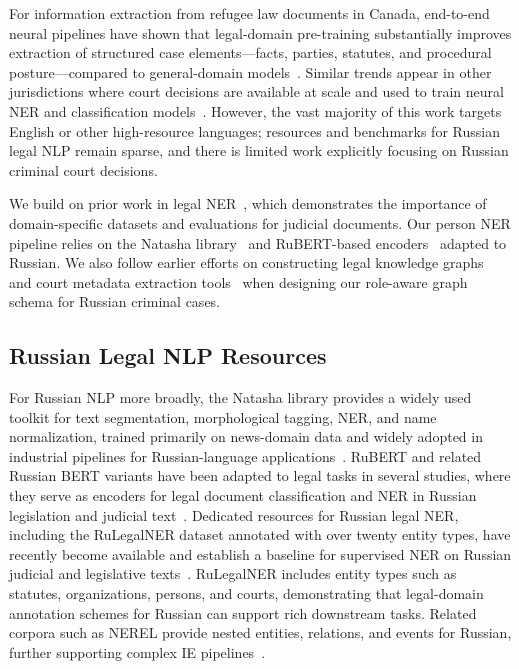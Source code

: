 \documentclass[11pt]{article}
\begin{document}
For information extraction from refugee law documents in Canada, end-to-end neural pipelines have shown that legal-domain pre-training substantially improves extraction of structured case elements---facts, parties, statutes, and procedural posture---compared to general-domain models~\cite{Paul2022Rhetorical,Gao2023LawBench}. Similar trends appear in other jurisdictions where court decisions are available at scale and used to train neural NER and classification models~\cite{Allam2021Siamese,Poddar2022Summarization}. However, the vast majority of this work targets English or other high-resource languages; resources and benchmarks for Russian legal NLP remain sparse, and there is limited work explicitly focusing on Russian criminal court decisions.

We build on prior work in legal NER~\cite{bhattacharya2023legaleval,dalpiaz2023legalner,ave2023rulegalner}, which demonstrates the importance of domain-specific datasets and evaluations for judicial documents. Our person NER pipeline relies on the Natasha library~\cite{natasha} and RuBERT-based encoders~\cite{Kuratov2019RuBERT,Devlin2019BERT} adapted to Russian. We also follow earlier efforts on constructing legal knowledge graphs~\cite{zhang2019chineselegalkg,Shi2022JobCrimes,Morariu2023Embeddings} and court metadata extraction tools~\cite{cedar2020courtextractor} when designing our role-aware graph schema for Russian criminal cases.

\subsection{Russian Legal NLP Resources}

For Russian NLP more broadly, the Natasha library provides a widely used toolkit for text segmentation, morphological tagging, NER, and name normalization, trained primarily on news-domain data and widely adopted in industrial pipelines for Russian-language applications~\cite{natasha}. RuBERT and related Russian BERT variants have been adapted to legal tasks in several studies, where they serve as encoders for legal document classification and NER in Russian legislation and judicial text~\cite{Kuratov2019RuBERT,Tutubalina2019}. Dedicated resources for Russian legal NER, including the RuLegalNER dataset annotated with over twenty entity types, have recently become available and establish a baseline for supervised NER on Russian judicial and legislative texts~\cite{ave2023rulegalner}. RuLegalNER includes entity types such as statutes, organizations, persons, and courts, demonstrating that legal-domain annotation schemes for Russian can support rich downstream tasks. Related corpora such as NEREL provide nested entities, relations, and events for Russian, further supporting complex IE pipelines~\cite{Zhdanov2021NEREL}.
\end{document}
